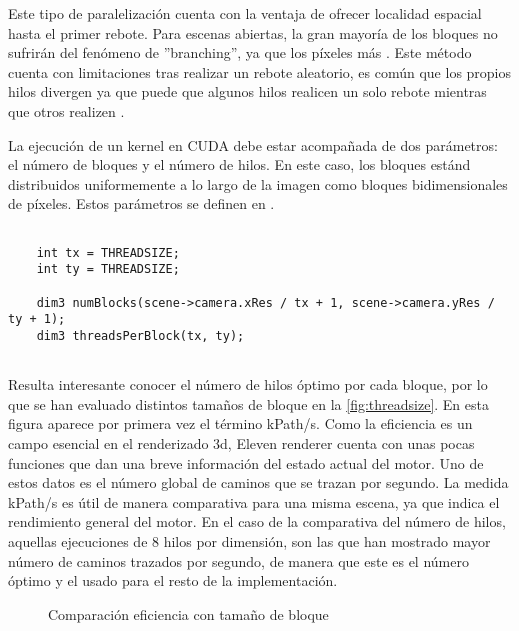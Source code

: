 Este tipo de paralelización cuenta con la ventaja de ofrecer localidad espacial hasta el primer rebote. Para escenas abiertas, la gran mayoría de los bloques no sufrirán del fenómeno de ''branching'', ya que los píxeles más  . Este método cuenta con limitaciones tras realizar un rebote aleatorio, es común que los propios hilos divergen ya que puede que algunos hilos realicen un solo rebote mientras que otros realizen . 

La ejecución de un kernel en CUDA debe estar acompañada de dos parámetros: el número de bloques y el número de hilos. En este caso, los bloques estánd distribuidos uniformemente a lo largo de la imagen como bloques bidimensionales de  píxeles. Estos parámetros se definen en .

\begin{minipage}[c]{0.95\textwidth}
\begin{lstlisting}[label={cod:kernelpars}, caption={Selección de parámetros para el kernel principal}]
	
    int tx = THREADSIZE;
    int ty = THREADSIZE;

    dim3 numBlocks(scene->camera.xRes / tx + 1, scene->camera.yRes / ty + 1);
    dim3 threadsPerBlock(tx, ty);
	
\end{lstlisting}
\end{minipage}

Resulta interesante conocer el número de hilos óptimo por cada bloque, por lo que se han evaluado distintos tamaños de bloque en la \autoref{fig:threadsize}. En esta figura aparece por primera vez el término kPath/s. Como la eficiencia es un campo esencial en el renderizado 3d, Eleven renderer cuenta con unas pocas funciones que dan una breve información del estado actual del motor. Uno de estos datos es el número global de caminos que se trazan por segundo. La medida kPath/s es útil de manera comparativa para una misma escena, ya que indica el rendimiento general del motor. En el caso de la comparativa del número de hilos, aquellas ejecuciones de 8 hilos por dimensión, son las que han mostrado mayor número de caminos trazados por segundo, de manera que este es el número óptimo y el usado para el resto de la implementación.

\begin{figure}[H]
\centering
{}
\caption{Comparación eficiencia con tamaño de bloque}
\label{fig:threadsize}
\end{figure}


